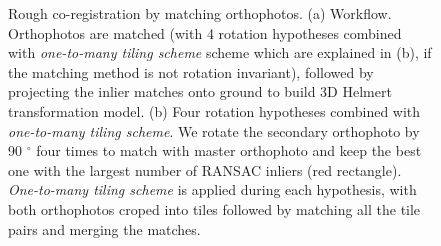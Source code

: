\begin{figure}[htbp]
    \begin{center}
        \caption{Rough co-registration by matching orthophotos. (a) Workflow. Orthophotos are matched (with 4 rotation hypotheses combined with \textit{one-to-many tiling scheme} scheme which are explained in (b), if the matching method is not rotation invariant), followed by projecting the inlier matches onto ground to build 3D Helmert transformation model. (b) Four rotation hypotheses combined with \textit{one-to-many tiling scheme}. We rotate the secondary orthophoto by 90 $^\circ$ four times to match with master orthophoto and keep the best one with the largest number of RANSAC inliers (red rectangle). \textit{One-to-many tiling scheme} is applied during each hypothesis, with both orthophotos croped into tiles followed by matching all the tile pairs and merging the matches.}
        \label{WorkflowOrtho}
    \end{center}
\end{figure}

